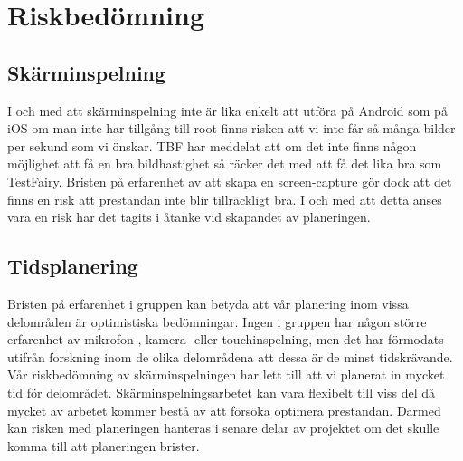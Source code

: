 \section{Riskbedömning}

\subsection{Skärminspelning}
I och med att skärminspelning inte är lika enkelt att utföra på Android som på iOS om man inte har tillgång till root finns risken att vi inte får så många bilder per sekund som vi önskar. TBF har meddelat att om det inte finns någon möjlighet att få en bra bildhastighet så räcker det med att få det lika bra som TestFairy. Bristen på erfarenhet av att skapa en screen-capture gör dock att det finns en risk att prestandan inte blir tillräckligt bra. I och med att detta anses vara en risk har det tagits i åtanke vid skapandet av planeringen.

\subsection{Tidsplanering}
Bristen på erfarenhet i gruppen kan betyda att vår planering inom vissa delområden är optimistiska bedömningar. Ingen i gruppen har någon större erfarenhet av mikrofon-, kamera- eller touchinspelning, men det har förmodats utifrån forskning inom de olika delområdena att dessa är de minst tidskrävande. Vår riskbedömning av skärminspelningen har lett till att vi planerat in mycket tid för delområdet. Skärminspelningsarbetet kan vara flexibelt till viss del då mycket av arbetet kommer bestå av att försöka optimera prestandan. Därmed kan risken med planeringen hanteras i senare delar av projektet om det skulle komma till att planeringen brister.